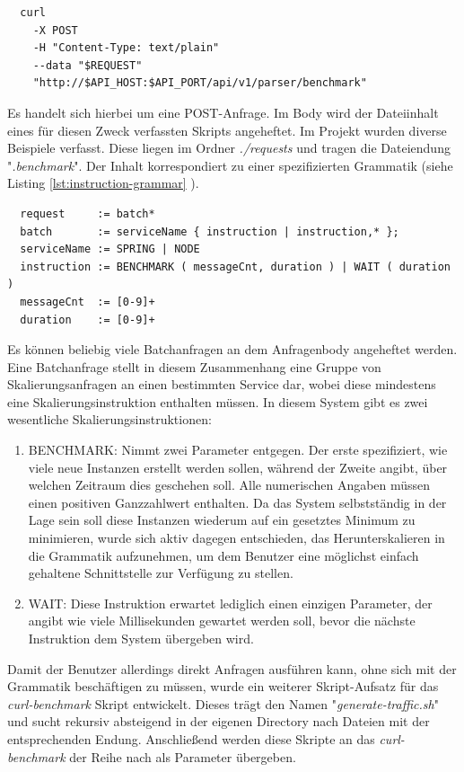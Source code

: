 \begin{verbatim}
  curl 
    -X POST 
    -H "Content-Type: text/plain" 
    --data "$REQUEST" 
    "http://$API_HOST:$API_PORT/api/v1/parser/benchmark"
\end{verbatim}

Es handelt sich hierbei um eine POST-Anfrage. Im Body wird der Dateiinhalt eines für diesen Zweck verfassten Skripts angeheftet. Im Projekt wurden diverse Beispiele verfasst. Diese liegen im Ordner \emph{./requests} und tragen die Dateiendung "\emph{.benchmark}". Der Inhalt korrespondiert zu einer spezifizierten Grammatik (siehe Listing \ref{lst:instruction-grammar} ).

\label{lst:instruction-grammar}
\begin{verbatim}
  request     := batch*
  batch       := serviceName { instruction | instruction,* };
  serviceName := SPRING | NODE
  instruction := BENCHMARK ( messageCnt, duration ) | WAIT ( duration )
  messageCnt  := [0-9]+
  duration    := [0-9]+
\end{verbatim}

Es können beliebig viele Batchanfragen an dem Anfragenbody angeheftet werden. Eine Batchanfrage stellt in diesem Zusammenhang eine Gruppe von Skalierungsanfragen an einen bestimmten Service dar, wobei diese mindestens eine Skalierungsinstruktion enthalten müssen. In diesem System gibt es zwei wesentliche Skalierungsinstruktionen: 

\begin{enumerate}
  \item BENCHMARK: Nimmt zwei Parameter entgegen. Der erste spezifiziert, wie viele neue Instanzen erstellt werden sollen, während der Zweite angibt, über welchen Zeitraum dies geschehen soll. Alle numerischen Angaben müssen einen positiven Ganzzahlwert enthalten. Da das System selbstständig in der Lage sein soll diese Instanzen wiederum auf ein gesetztes Minimum zu minimieren, wurde sich aktiv dagegen entschieden, das Herunterskalieren in die Grammatik aufzunehmen, um dem Benutzer eine möglichst einfach gehaltene Schnittstelle zur Verfügung zu stellen.
  \item WAIT: Diese Instruktion erwartet lediglich einen einzigen Parameter, der angibt wie viele Millisekunden gewartet werden soll, bevor die nächste Instruktion dem System übergeben wird. 
\end{enumerate}


Damit der Benutzer allerdings direkt Anfragen ausführen kann, ohne sich mit der Grammatik beschäftigen zu müssen, wurde ein weiterer Skript-Aufsatz 
für das \emph{curl-benchmark} Skript entwickelt. Dieses trägt den Namen "\emph{generate-traffic.sh}" und sucht rekursiv absteigend in der eigenen Directory nach Dateien mit der entsprechenden Endung. Anschließend werden diese Skripte an das \emph{curl-benchmark} der Reihe nach als Parameter übergeben.

